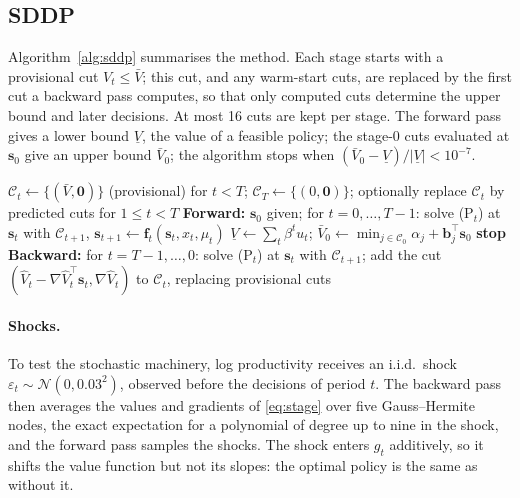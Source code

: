 \subsection{SDDP}

Algorithm~\ref{alg:sddp} summarises the method. Each stage starts with a provisional cut $V_{t} \le \bar V$; this cut, and any warm-start cuts, are replaced by the first cut a backward pass computes, so that only computed cuts determine the upper bound and later decisions. At most 16 cuts are kept per stage. The forward pass gives a lower bound $\underline{V}$, the value of a feasible policy; the stage-0 cuts evaluated at $\bm{s}_0$ give an upper bound $\bar V_0$; the algorithm stops when $(\bar V_0 - \underline{V})/|\underline{V}| < 10^{-7}$.

\begin{algorithm}[t]
\caption{SDDP for ACE}
\label{alg:sddp}
\begin{algorithmic}[1]
\State $\mathcal{C}_t \gets \{(\bar V, \bm{0})\}$ (provisional) for $t < T$; $\mathcal{C}_T \gets \{(0, \bm{0})\}$; optionally replace $\mathcal{C}_t$ by predicted cuts for $1 \le t < T$
    \State \textbf{Forward:} $\bm{s}_0$ given; for $t = 0, \dots, T-1$: solve (P$_t$) at $\bm{s}_t$ with $\mathcal{C}_{t+1}$, $\bm{s}_{t+1} \gets \bm{f}_t(\bm{s}_t, x_t, \mu_t)$
    \State $\underline{V} \gets \sum_t \beta^t u_t$; \quad $\bar V_0 \gets \min_{j \in \mathcal{C}_0} \alpha_j + \bm{b}_j^\top \bm{s}_0$
     \textbf{stop} \EndIf
    \State \textbf{Backward:} for $t = T-1, \dots, 0$: solve (P$_t$) at $\bm{s}_t$ with $\mathcal{C}_{t+1}$; add the cut $(\hat V_t - \nabla\hat V_t^\top\bm{s}_t, \nabla\hat V_t)$ to $\mathcal{C}_t$, replacing provisional cuts
\EndFor
\end{algorithmic}
\end{algorithm}

\paragraph{Shocks.} To test the stochastic machinery, log productivity receives an i.i.d.\ shock $\varepsilon_t \sim \mathcal{N}(0, 0.03^2)$, observed before the decisions of period $t$. The backward pass then averages the values and gradients of \eqref{eq:stage} over five Gauss--Hermite nodes, the exact expectation for a polynomial of degree up to nine in the shock, and the forward pass samples the shocks. The shock enters $g_t$ additively, so it shifts the value function but not its slopes: the optimal policy is the same as without it.

